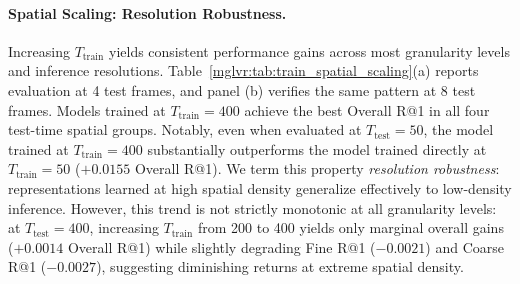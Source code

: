 \paragraph{Spatial Scaling: Resolution Robustness.}
Increasing $T_{\text{train}}$ yields consistent performance gains across most granularity levels and inference resolutions. Table~\ref{mglvr:tab:train_spatial_scaling}(a) reports evaluation at 4 test frames, and panel (b) verifies the same pattern at 8 test frames. Models trained at $T_{\text{train}} = 400$ achieve the best Overall R@1 in all four test-time spatial groups. Notably, even when evaluated at $T_{\text{test}} = 50$, the model trained at $T_{\text{train}} = 400$ substantially outperforms the model trained directly at $T_{\text{train}} = 50$ ($+0.0155$ Overall R@1). We term this property \textit{resolution robustness}: representations learned at high spatial density generalize effectively to low-density inference. However, this trend is not strictly monotonic at all granularity levels: at $T_{\text{test}} = 400$, increasing $T_{\text{train}}$ from 200 to 400 yields only marginal overall gains ($+0.0014$ Overall R@1) while slightly degrading Fine R@1 ($-0.0021$) and Coarse R@1 ($-0.0027$), suggesting diminishing returns at extreme spatial density.

